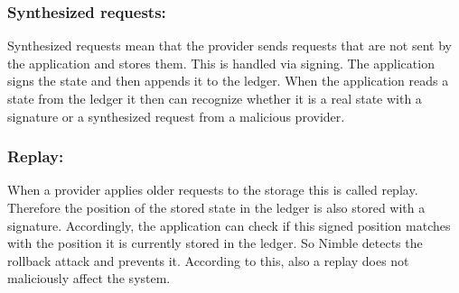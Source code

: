 	\subsubsection*{Synthesized requests:} Synthesized requests mean that the provider sends requests that are not sent by the application and stores them. This is handled via signing. The application signs the state and then appends it to the ledger. When the application reads a state from the ledger it then can recognize whether it is a real state with a signature or a synthesized request from a malicious provider.
	\subsubsection*{Replay:} When a provider applies older requests to the storage this is called replay. Therefore the position of the stored state in the ledger is also stored with a signature. Accordingly, the application can check if this signed position matches with the position it is currently stored in the ledger. So Nimble detects the rollback attack and prevents it. According to this, also a replay does not maliciously affect the system.\\
	
